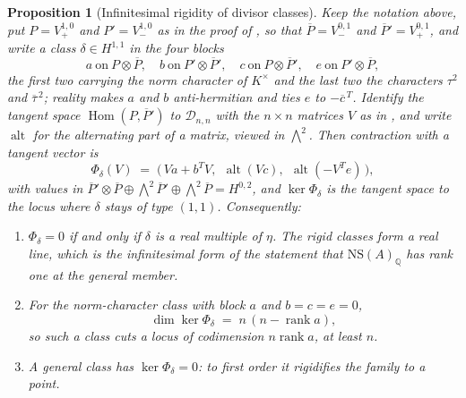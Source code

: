 \documentclass[11pt,reqno]{amsart}
\theoremstyle{plain}
\newtheorem{proposition}[theorem]{Proposition}
\theoremstyle{definition}
\theoremstyle{remark}
\newcommand{\QQ}{\mathbb{Q}}
\newcommand{\cD}{\mathcal{D}}
\newcommand{\NS}{\mathrm{NS}}
\DeclareMathOperator{\Hom}{Hom}
\newcommand{\Kx}{K^{\times}}
\newcommand{\bbar}[1]{\overline{#1}}
\begin{document}
\begin{proposition}[Infinitesimal rigidity of divisor classes]%
\label{prop:rigidity}
Keep the notation above, put $P=V_{+}^{1,0}$ and $P'=V_{-}^{1,0}$ as in the
proof of , so that $\bbar{P}=V_{-}^{0,1}$ and
$\bbar{P}'=V_{+}^{0,1}$, and write a class $\delta\in H^{1,1}$ in the four
blocks
\[
  a\ \text{on}\ P\otimes\bbar{P},\quad
  b\ \text{on}\ P'\otimes\bbar{P}',\quad
  c\ \text{on}\ P\otimes\bbar{P}',\quad
  e\ \text{on}\ P'\otimes\bbar{P},
\]
the first two carrying the norm character of $\Kx$ and the last two the
characters $\tau^{2}$ and $\bbar\tau^{\,2}$; reality makes $a$ and $b$
anti-hermitian and ties $e$ to $-\bbar{c}^{\,T}$. Identify the tangent space
$\Hom(P,\bbar{P}')$ to $\cD_{n,n}$ with the $n\times n$ matrices $V$ as in
, and write $\operatorname{alt}$ for the alternating part
of a matrix, viewed in $\bigwedge^{2}$. Then contraction with a tangent
vector is
\begin{equation}\label{eq:phidelta}
  \Phi_{\delta}(V)
  \;=\;\bigl(\,Va+b^{T}V,\ \ \operatorname{alt}(Vc),\ \
       \operatorname{alt}(-V^{T}e)\,\bigr),
\end{equation}
with values in
$\bbar{P}'\otimes\bbar{P}\oplus\bigwedge^{2}\bbar{P}'\oplus\bigwedge^{2}\bbar{P}
=H^{0,2}$, and $\ker\Phi_{\delta}$ is the tangent space to the locus where
$\delta$ stays of type $(1,1)$. Consequently:
\begin{enumerate}[label=\textup{(\roman*)},nosep]
\item $\Phi_{\delta}=0$ if and only if $\delta$ is a real multiple of $\eta$.
  The rigid classes form a real line, which is the infinitesimal form of the
  statement that $\NS(A)_{\QQ}$ has rank one at the general member.
\item For the norm-character class with block $a$ and $b=c=e=0$,
  \[
    \dim\ker\Phi_{\delta}\;=\;n\,(n-\operatorname{rank}a),
  \]
  so such a class cuts a locus of codimension $n\operatorname{rank}a$, at
  least $n$.
\item A general class has $\ker\Phi_{\delta}=0$: to first order it
  rigidifies the family to a point.
\end{enumerate}
\end{proposition}
\end{document}
